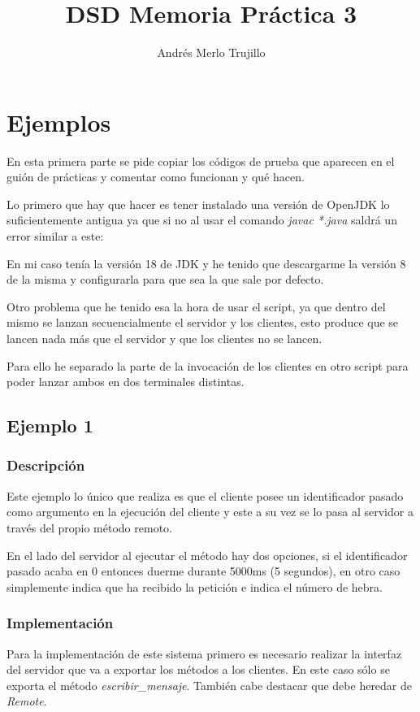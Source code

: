 \documentclass{article}
\title{DSD Memoria Práctica 3}
\author{Andrés Merlo Trujillo}
\date{}
\begin{document}
\maketitle

\section{Ejemplos}
En esta primera parte se pide copiar los códigos de prueba que aparecen en el guión de prácticas y comentar como funcionan y qué hacen.

Lo primero que hay que hacer es tener instalado una versión de OpenJDK lo suficientemente antigua ya que si no al usar el comando \textit{javac *.java} saldrá un error similar a este:


En mi caso tenía la versión 18 de JDK y he tenido que descargarme la versión 8 de la misma y configurarla para que sea la que sale por defecto.

Otro problema que he tenido esa la hora de usar el script, ya que dentro del mismo se lanzan secuencialmente el servidor y los clientes, esto produce que se lancen nada más que el servidor y que los clientes no se lancen.

Para ello he separado la parte de la invocación de los clientes en otro script para poder lanzar ambos en dos terminales distintas.

\subsection{Ejemplo 1}
\subsubsection{Descripción}
Este ejemplo lo único que realiza es que el cliente posee un identificador pasado como argumento en la ejecución del cliente y este a su vez se lo pasa al servidor a través del propio método remoto.

En el lado del servidor al ejecutar el método hay dos opciones, si el identificador pasado acaba en 0 entonces duerme durante 5000ms (5 segundos), en otro caso simplemente indica que ha recibido la petición e indica el número de hebra.


\subsubsection{Implementación}
Para la implementación de este sistema primero es necesario realizar la interfaz del servidor que va a exportar los métodos a los clientes. En este caso sólo se exporta el método \textit{escribir\_mensaje}. También cabe destacar que debe heredar de \textit{Remote}.
\end{document}
